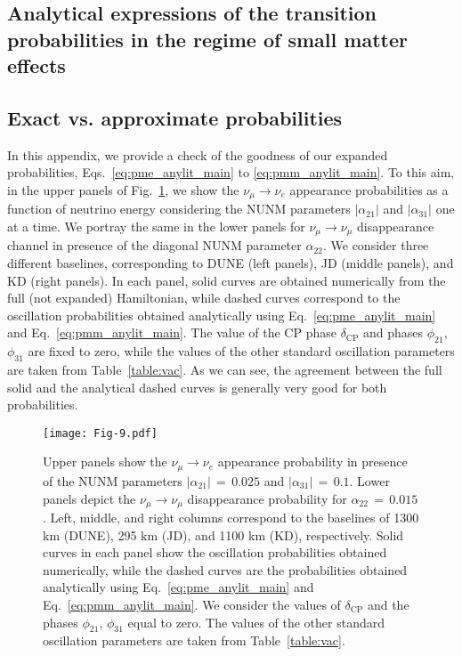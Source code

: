 \documentclass[11pt,a4paper]{article}
\newcommand{\capdef}{}
\newcommand{\mycaption}[2][\capdef]{\renewcommand{\capdef}{#2}
	\caption[#1]{{\footnotesize #2}}}
\begin{document}
\begin{appendix}


\renewcommand\thefigure{A\arabic{figure}}
\renewcommand\theequation{A\arabic{equation}}
\setcounter{figure}{0} 
\setcounter{equation}{0}


\section{Analytical expressions of the transition probabilities in the regime of small matter effects}
\label{Appendix:A}
\subsection*{Exact vs. approximate probabilities}
In this appendix, we provide a check of the goodness of our expanded probabilities,  Eqs.~\ref{eq:pme_anylit_main} to \ref{eq:pmm_anylit_main}. To this aim, in the upper panels of Fig.~\ref{fig:prob_mueCheck}, we show the $\nu_{\mu}\rightarrow\nu_{e}$  appearance probabilities as a function of neutrino energy considering the NUNM parameters 
$|\alpha_{21}|$ and $|\alpha_{31}|$ one at a time. We portray the same in the lower panels for $\nu_{\mu}\rightarrow\nu_{\mu}$  disappearance channel in presence of the diagonal NUNM parameter $\alpha_{22}$.
We consider three different baselines, corresponding to DUNE (left panels), JD (middle panels), and KD (right panels). In each panel, solid curves are obtained numerically from the full (not expanded) Hamiltonian, while dashed curves correspond to the oscillation probabilities obtained analytically using Eq.~\ref{eq:pme_anylit_main} and Eq.~\ref{eq:pmm_anylit_main}. The value of the CP phase $\delta_{\mathrm{CP}}$ and phases $\phi_{21}$, $\phi_{31}$ are fixed to zero, while the values of the other standard oscillation parameters are taken from Table\ \ref{table:vac}. As we can see, the agreement between the full solid and the analytical dashed curves is generally very good for both probabilities.

\begin{figure}[h!]
\centering
\texttt{[image: Fig-9.pdf]}
\mycaption{Upper panels show the $\nu_{\mu}\rightarrow\nu_{e}$ appearance probability in presence of the NUNM parameters $|\alpha_{21}|\,=\,0.025$ and $|\alpha_{31}|\,=\,0.1$. Lower panels depict the $\nu_{\mu}\rightarrow\nu_{\mu}$
disappearance probability for $\alpha_{22}\,=\,0.015$. 	
Left, middle, and right columns correspond to the baselines of 1300 km (DUNE), 295 km (JD), and 1100 km (KD), respectively.
Solid curves in each panel show the oscillation probabilities obtained numerically, while the dashed curves are the probabilities obtained analytically using Eq.~\ref{eq:pme_anylit_main} and Eq.~\ref{eq:pmm_anylit_main}. We consider the values of  $\delta_{\mathrm{CP}}$ and the phases $\phi_{21}$, $\phi_{31}$ equal to zero. The values of the other standard oscillation parameters are taken from Table~\ref{table:vac}. }
\label{fig:prob_mueCheck}
\end{figure}


\end{appendix}
\end{document}
